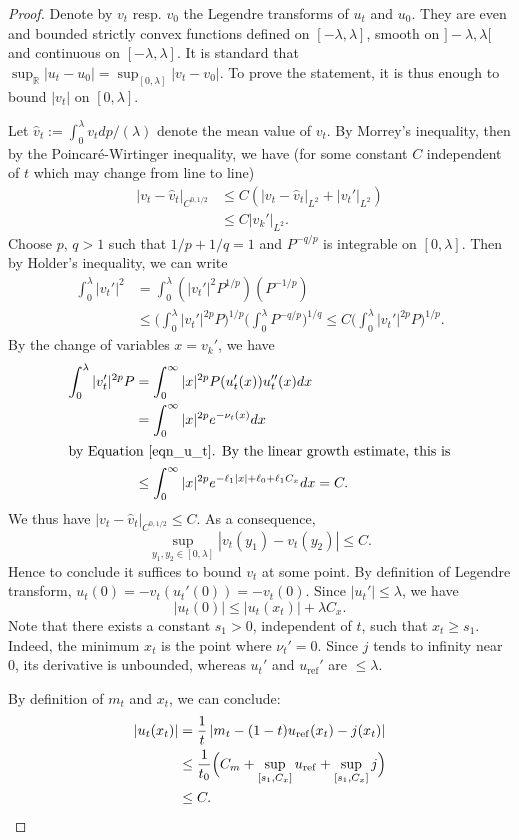 \documentclass[JEP,XML,SOM,Unicode, NoEqCountersInSection, NoFloatCountersInSection]{cedram}
\theoremstyle{plain}
\theoremstyle{definition}
\begin{document}
\begin{proof}
Denote by $v_t$ resp. $v_0$ the Legendre transforms
of $u_t$ and $u_0$. They are even and bounded strictly
convex functions defined on $[-\lambda,\lambda]$, smooth on $]-\lambda,\lambda[$
and continuous on $[-\lambda,\lambda]$.
It is standard that $\sup_{\mathbb{R}}|u_t-u_0| = \sup_{[0,\lambda]} |v_t-v_0|$.
To prove the statement, it is thus enough
to bound $|v_t|$ on $[0,\lambda]$.

Let $\hat{v}_t:=\int_0^{\lambda}v_tdp/(\lambda)$ denote the mean value of $v_t$.
By Morrey's inequality, then by the Poincaré-Wirtinger inequality, we have (for some
constant $C$ independent of $t$ which may change from line to line)
\begin{align*}
|v_t-\hat{v}_t|_{C^{0,1/2}} &\leq C \left(|v_t-\hat{v}_t|_{L^{2}}+|v_t'|_{L^{2}}\right) \\
& \leq C |v_k'|_{L^{2}}.
\end{align*}
Choose $p$, $q>1$ such that $1/p+1/q=1$ and $P^{-q/p}$ is integrable on $[0,\lambda]$.
Then by Holder's inequality, we can write
\begin{align*}
\int_0^{\lambda} |v_t'|^2 & = \int_0^{\lambda} (|v_t'|^2P^{1/p}) (P^{-1/p}) \\
&\leq \biggl(\int_0^{\lambda} |v_t'|^{2p}P\biggr)^{1/p}\biggl(\int_0^{\lambda} P^{-q/p}\biggr)^{1/q} \leq C \biggl(\int_0^{\lambda} |v_t'|^{2p}P\biggr)^{1/p}.
\end{align*}
By the change of variables $x=v_k'$, we have
\begin{align*}
\int_0^{\lambda} |v_t'|^{2p}P & = \int_0^{\infty} |x|^{2p} P(u_t'(x))u_t''(x) dx \\
& = \int_0^{\infty} |x|^{2p} e^{-\nu_t(x)}dx \\
\intertext{by Equation~\eqref{eqn_u_t}. By the linear growth estimate, this is}
& \leq \int_0^{\infty} |x|^{2p} e^{-\ell_1|x|+\ell_0+\ell_1C_x} dx = C.
\end{align*}
We thus have $|v_t-\hat{v}_t|_{C^{0,1/2}} \leq C$.
As a consequence,
\begin{equation*}
\sup_{y_1,y_2\in [0,\lambda]} |v_t(y_1)-v_t(y_2)| \leq C.
\end{equation*}
Hence to conclude it suffices to bound $v_t$ at some point.
By definition of Legendre transform, $u_t(0)=-v_t(u_t'(0))=-v_t(0)$.
Since $|u_t'|\leq \lambda$, we have
\begin{equation*}
|u_t(0)|\leq |u_t(x_t)|+\lambda C_x.
\end{equation*}
Note that there exists a constant $s_1>0$, independent of $t$, such that
$x_t\geq s_1$.
Indeed, the minimum $x_t$ is the point where $\nu_t'=0$.
Since $j$ tends to infinity near $0$, its derivative is unbounded,
whereas $u_t'$ and $u_{\mathrm{ref}}'$ are $\leq \lambda$.

By definition of $m_t$ and $x_t$, we can conclude:
\begin{align*}
|u_t(x_t)|&=\frac{1}{t}\left| m_t-(1-t)u_{\mathrm{ref}}(x_t)-j(x_t)\right| \\
& \leq \frac{1}{t_0}\Bigl( C_m+\sup_{[s_1,C_x]}u_{\mathrm{ref}}+\sup_{[s_1,C_x]}j \Bigr) \\
& \leq C.\qedhere
\end{align*}
\end{proof}
\end{document}
